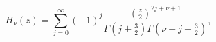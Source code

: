 \begin{equation}
H_{\nu }\left(z\right)=\sum _{j=0}^{\infty }\left(-1\right)^{j}\frac{\left(\frac{z}{2}\right)^{2j+\nu +1}}{\Gamma \left(j+\frac{3}{2}\right)\Gamma \left(\nu +j+\frac{3}{2}\right)},\end{equation}


